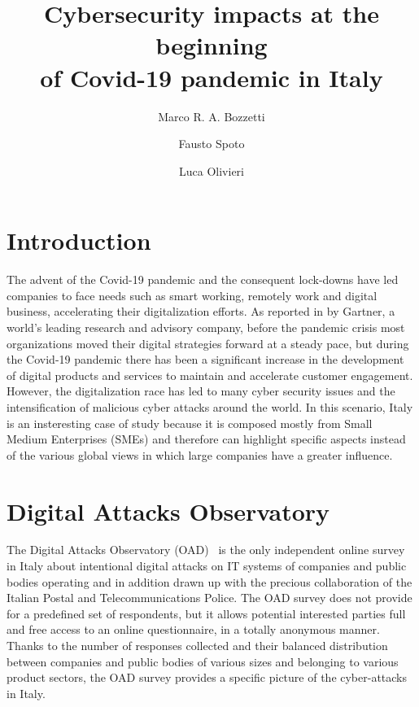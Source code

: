\documentclass{easychair}
\title{Cybersecurity impacts at the beginning\\ of Covid-19 pandemic in Italy}
\author{
Marco R. A. Bozzetti\inst{1}
\and
    Fausto Spoto\inst{2}
\and
   Luca Olivieri \inst{2}
}
\institute{
  President AIPSI\\
  Italian Chapter ISSA
\and
   University of Verona,
   Italy\\
   \email{\{fausto.spoto,luca.olivieri\}@univr.it}\\
 }
\begin{document}
\maketitle

\begin{abstract}
\end{abstract}


\section{Introduction}

The advent of the Covid-19 pandemic and the consequent lock-downs have led companies to face needs such as smart working, remotely work and digital business,
accelerating their digitalization efforts. As reported in \cite{Goasduff} by Gartner, a world's leading research and advisory company, before the pandemic crisis
most organizations moved their digital strategies forward at a steady pace, but during the Covid-19 pandemic there has been a significant increase in the 
development of digital products and services to maintain and accelerate customer engagement. However, the digitalization race has led to many cyber security issues
and the intensification of malicious cyber attacks around the world. In this scenario, Italy is an insteresting case of study because it is composed mostly from 
Small Medium Enterprises (SMEs) and therefore can highlight specific aspects instead of the various global views in which large companies have a greater influence.

\section{Digital Attacks Observatory}

The Digital Attacks Observatory (OAD)~\cite{OAD} is the only independent online survey in Italy about intentional digital attacks on IT systems of companies and public
bodies operating and in addition drawn up with the precious collaboration of the Italian Postal and Telecommunications Police. The OAD survey does not provide 
for a predefined set of respondents, but it allows potential interested parties full and free access to an online questionnaire, in a totally anonymous manner. 
Thanks to the number of responses collected and their balanced distribution between companies and public bodies of various sizes and belonging to various product 
sectors, the OAD survey provides a specific picture of the cyber-attacks in Italy.
\end{document}
